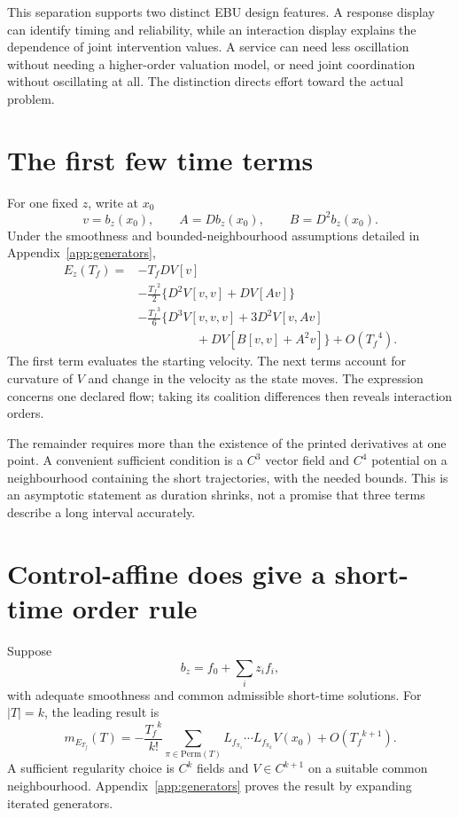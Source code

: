 
This separation supports two distinct EBU design features. A response display can identify timing and reliability, while an interaction display explains the dependence of joint intervention values. A service can need less oscillation without needing a higher-order valuation model, or need joint coordination without oscillating at all. The distinction directs effort toward the actual problem.

\section{The first few time terms}
For one fixed $z$, write at $x_0$
\[
 v=b_z(x_0),\qquad A=Db_z(x_0),\qquad B=D^2b_z(x_0).
\]
Under the smoothness and bounded-neighbourhood assumptions detailed in Appendix~\ref{app:generators},
\begin{align}\label{eq:short-time}
 E_z({T_f})={}&-{T_f} DV[v]\nonumber\\
 &-\frac{{T_f}^2}{2}\{D^2V[v,v]+DV[Av]\}\nonumber\\
 &-\frac{{T_f}^3}{6}\{D^3V[v,v,v]+3D^2V[v,Av]\nonumber\\
 &\hspace{56pt}+DV[B[v,v]+A^2v]\}+O({T_f}^4).
\end{align}
The first term evaluates the starting velocity. The next terms account for curvature of $V$ and change in the velocity as the state moves. The expression concerns one declared flow; taking its coalition differences then reveals interaction orders.

The remainder requires more than the existence of the printed derivatives at one point. A convenient sufficient condition is a $C^3$ vector field and $C^4$ potential on a neighbourhood containing the short trajectories, with the needed bounds. This is an asymptotic statement as duration shrinks, not a promise that three terms describe a long interval accurately.

\section{Control-affine does give a short-time order rule}
Suppose
\begin{equation}\label{eq:control-affine}
 b_z=f_0+\sum_i z_i f_i,
\end{equation}
with adequate smoothness and common admissible short-time solutions. For $|T|=k$, the leading result is
\begin{equation}\label{eq:lie-order}
 m_{E_{T_f}}(T)=-\frac{{T_f}^k}{k!}
 \sum_{\pi\in\mathrm{Perm}(T)}
 L_{f_{\pi_1}}\cdots L_{f_{\pi_k}}V(x_0)
 +O({T_f}^{k+1}).
\end{equation}
A sufficient regularity choice is $C^k$ fields and $V\in C^{k+1}$ on a suitable common neighbourhood. Appendix~\ref{app:generators} proves the result by expanding iterated generators.

